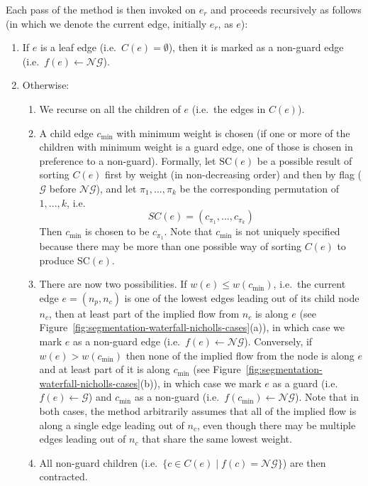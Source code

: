 \documentclass[preprint,a4paper]{elsarticle}
\begin{document}
Each pass of the method is then invoked on $e_r$ and proceeds recursively as follows (in which we denote the current edge, initially $e_r$, as $e$):
%
\begin{enumerate}

\item If $e$ is a leaf edge (i.e.~$C(e) = \emptyset$), then it is marked as a non-guard edge (i.e.~$f(e) \leftarrow \mathcal{NG}$).

\item Otherwise:

\begin{enumerate}

\item We recurse on all the children of $e$ (i.e.~the edges in $C(e)$).

\item A child edge $c_{\min}$ with minimum weight is chosen (if one or more of the children with minimum weight is a guard edge, one of those is chosen in preference to a non-guard). Formally, let $\mbox{SC}(e)$ be a possible result of sorting $C(e)$ first by weight (in non-decreasing order) and then by flag ($\mathcal{G}$ before $\mathcal{NG}$), and let $\pi_1,...,\pi_k$ be the corresponding permutation of $1,...,k$, i.e.
%
\[
SC(e) = (c_{\pi_1},...,c_{\pi_k})
\]
%
Then $c_{\min}$ is chosen to be $c_{\pi_1}$. Note that $c_{\min}$ is not uniquely specified because there may be more than one possible way of sorting $C(e)$ to produce $\mbox{SC}(e)$.

\item There are now two possibilities. If $w(e) \le w(c_{\min})$\footnotemark{}, i.e.~the current edge $e = (n_p,n_c)$ is one of the lowest edges leading out of its child node $n_c$, then at least part of the implied flow from $n_c$ is along $e$ (see Figure~\ref{fig:segmentation-waterfall-nicholls-cases}(a)), in which case we mark $e$ as a non-guard edge (i.e.~$f(e) \leftarrow \mathcal{NG}$). Conversely, if $w(e) > w(c_{\min})$ then none of the implied flow from the node is along $e$ and at least part of it is along $c_{\min}$ (see Figure~\ref{fig:segmentation-waterfall-nicholls-cases}(b)), in which case we mark $e$ as a guard (i.e.~$f(e) \leftarrow \mathcal{G}$) and $c_{\min}$ as a non-guard (i.e.~$f(c_{\min}) \leftarrow \mathcal{NG}$). Note that in both cases, the method arbitrarily assumes that all of the implied flow is along a single edge leading out of $n_c$, even though there may be multiple edges leading out of $n_c$ that share the same lowest weight.

\item All non-guard children (i.e.~$\{c \in C(e) \; | \; f(c) = \mathcal{NG}\}$) are then contracted.

\end{enumerate}

\end{enumerate}
\end{document}
